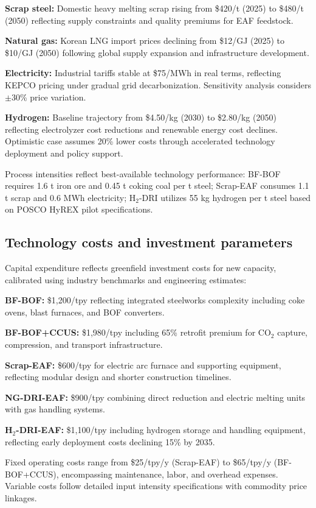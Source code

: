 \documentclass[preprint,1p,authoryear]{elsarticle}
\begin{document}
\textbf{Scrap steel:} Domestic heavy melting scrap rising from \$420/t (2025) to \$480/t (2050) reflecting supply constraints and quality premiums for EAF feedstock.

\textbf{Natural gas:} Korean LNG import prices declining from \$12/GJ (2025) to \$10/GJ (2050) following global supply expansion and infrastructure development.

\textbf{Electricity:} Industrial tariffs stable at \$75/MWh in real terms, reflecting KEPCO pricing under gradual grid decarbonization. Sensitivity analysis considers $\pm$30\% price variation.

\textbf{Hydrogen:} Baseline trajectory from \$4.50/kg (2030) to \$2.80/kg (2050) reflecting electrolyzer cost reductions and renewable energy cost declines. Optimistic case assumes 20\% lower costs through accelerated technology deployment and policy support.

Process intensities reflect best-available technology performance: BF-BOF requires 1.6 t iron ore and 0.45 t coking coal per t steel; Scrap-EAF consumes 1.1 t scrap and 0.6 MWh electricity; H$_2$-DRI utilizes 55 kg hydrogen per t steel based on POSCO HyREX pilot specifications.

\subsection{Technology costs and investment parameters}

Capital expenditure reflects greenfield investment costs for new capacity, calibrated using industry benchmarks and engineering estimates:

\textbf{BF-BOF:} \$1,200/tpy reflecting integrated steelworks complexity including coke ovens, blast furnaces, and BOF converters.

\textbf{BF-BOF+CCUS:} \$1,980/tpy including 65\% retrofit premium for CO$_2$ capture, compression, and transport infrastructure.

\textbf{Scrap-EAF:} \$600/tpy for electric arc furnace and supporting equipment, reflecting modular design and shorter construction timelines.

\textbf{NG-DRI-EAF:} \$900/tpy combining direct reduction and electric melting units with gas handling systems.

\textbf{H$_2$-DRI-EAF:} \$1,100/tpy including hydrogen storage and handling equipment, reflecting early deployment costs declining 15\% by 2035.

Fixed operating costs range from \$25/tpy/y (Scrap-EAF) to \$65/tpy/y (BF-BOF+CCUS), encompassing maintenance, labor, and overhead expenses. Variable costs follow detailed input intensity specifications with commodity price linkages.
\end{document}
